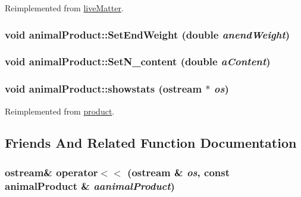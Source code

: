 Reimplemented from \hyperlink{classlive_matter_acaf1db5a1bb2fc9beb79002771f0282c}{liveMatter}.\hypertarget{classanimal_product_af704d07b4515268baf6dff12906299aa}{
\subsubsection[{SetEndWeight}]{\setlength{\rightskip}{0pt plus 5cm}void animalProduct::SetEndWeight (double {\em anendWeight})}}
\label{classanimal_product_af704d07b4515268baf6dff12906299aa}
\hypertarget{classanimal_product_ad101c1731a1048cdc54d290fd38b6467}{
\subsubsection[{SetN\_\-content}]{\setlength{\rightskip}{0pt plus 5cm}void animalProduct::SetN\_\-content (double {\em aContent})}}
\label{classanimal_product_ad101c1731a1048cdc54d290fd38b6467}
\hypertarget{classanimal_product_a22f3158bf013dbbc8519987dee8a34ff}{
\subsubsection[{showstats}]{\setlength{\rightskip}{0pt plus 5cm}void animalProduct::showstats (ostream $\ast$ {\em os})}}
\label{classanimal_product_a22f3158bf013dbbc8519987dee8a34ff}


Reimplemented from \hyperlink{classproduct_a1151ea416ab90047f8d087be57a6d7b1}{product}.

\subsection{Friends And Related Function Documentation}
\hypertarget{classanimal_product_abeaab9718f6e5b0d6ab31bff4fd06032}{
\subsubsection[{operator$<$$<$}]{\setlength{\rightskip}{0pt plus 5cm}ostream\& operator$<$$<$ (ostream \& {\em os}, \/  const {\bf animalProduct} \& {\em aanimalProduct})}}
\label{classanimal_product_abeaab9718f6e5b0d6ab31bff4fd06032}


